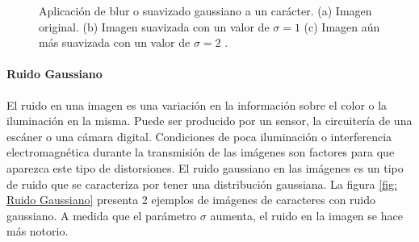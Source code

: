 		\begin{figure}[htbp]
			\centering
			\caption[Suavizado Gaussiano de un carácter]{Aplicación de blur o suavizado gaussiano a un carácter. (a) Imagen original. (b) Imagen suavizada con un valor de $\sigma = 1$  (c) Imagen aún más suavizada con un valor de $\sigma = 2$ .}
			\label{fig: Suavizado Gaussiano}
		\end{figure}				
			
			
		\paragraph{Ruido Gaussiano}			
			
			El ruido en una imagen es una variación en la información sobre el color o la iluminación en la misma. Puede ser producido por un sensor, la circuitería de una escáner o una cámara digital. Condiciones de poca iluminación o interferencia electromagnética durante la transmisión de las imágenes son factores para que aparezca este tipo de distorsiones. El ruido gaussiano en las imágenes es un tipo de ruido que se caracteriza por tener una distribución gaussiana. La figura \ref{fig: Ruido Gaussiano} presenta 2 ejemplos de imágenes de caracteres con ruido gaussiano. A medida que el parámetro $\sigma$  aumenta, el ruido en la imagen se hace más notorio.
			
